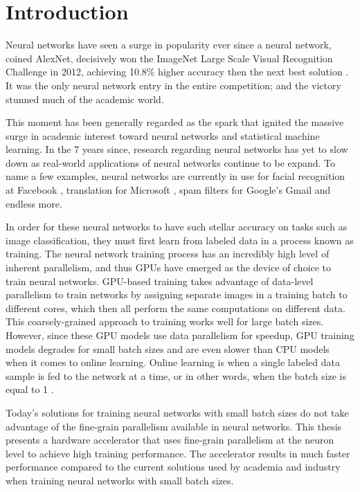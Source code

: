 \chapter{Introduction}
Neural networks have seen a surge in popularity ever since a neural network, coined AlexNet, decisively won the ImageNet Large Scale Visual Recognition Challenge in 2012, achieving 10.8\% higher accuracy then the next best solution \cite{Krizhevsky}. It was the only neural network entry in the entire competition; and the victory stunned much of the academic world.

This moment has been generally regarded as the spark that ignited the massive surge in academic interest toward neural networks and statistical machine learning. In the 7 years since, research regarding neural networks has yet to slow down as real-world applications of neural networks continue to be expand. To name a few examples, neural networks are currently in use for facial recognition at Facebook \cite{deepface}, translation for Microsoft \cite{translation}, spam filters for Google's Gmail \cite{gmail} and endless more.

In order for these neural networks to have such stellar accuracy on tasks such as image classification, they must first learn from labeled data in a process known as training. The neural network training process has an incredibly high level of inherent parallelism, and thus GPUs have emerged as the device of choice to train neural networks. GPU-based training takes advantage of data-level parallelism to train networks by assigning separate images in a training batch to different cores, which then all perform the same computations on different data. This coarsely-grained approach to training works well for large batch sizes. However, since these GPU models use data parallelism for speedup, GPU training models degrades for small batch sizes and are even slower than CPU models when it comes to online learning. Online learning is when a single labeled data sample is fed to the network at a time, or in other words, when the batch size is equal to 1 \cite{batch-size}. 

Today's solutions for training neural networks with small batch sizes do not take advantage of the fine-grain parallelism available in neural networks. This thesis presents a hardware accelerator that uses fine-grain parallelism at the neuron level to achieve high training performance. The accelerator results in much faster performance compared to the current solutions used by academia and industry when training neural networks with small batch sizes.


